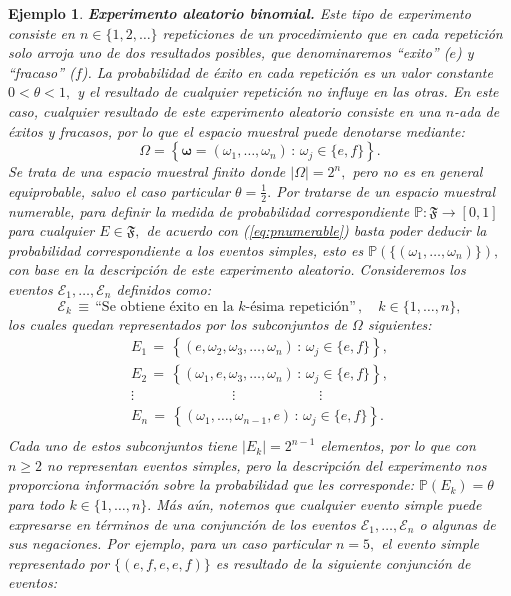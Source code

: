 \documentclass[spanish,10pt,letterpaper]{article}
\newtheorem{ejem}{Ejemplo}
\newcommand{\prob}{\mathbb{P}}
\begin{document}
	\begin{ejem} \label{ej:experimBinomial}
		\textbf{Experimento aleatorio binomial.} Este tipo de experimento consiste en $n\in\{1,2,\ldots\}$ repeticiones de un procedimiento que en cada repetición solo arroja uno de dos resultados posibles, que denominaremos ``exito'' ($e$) y ``fracaso'' ($f$). La probabilidad de éxito en cada repetición es un valor constante $0<\theta<1,$ y el resultado de cualquier repetición no influye en las otras. En este caso, cualquier resultado de este experimento aleatorio consiste en una $n$-ada de éxitos y fracasos, por lo que el espacio muestral puede denotarse mediante: $$\Omega=\left\{\mathbf{\omega}=(\omega_1,\ldots,\omega_n)\,:\,\omega_j\in\{e,f\}\right\}.$$ Se trata de una espacio muestral finito donde $|\Omega|=2^n,$ pero no es en general equiprobable, salvo el caso particular $\theta=\frac{1}{2}.$ Por tratarse de un espacio muestral numerable, para definir la medida de probabilidad correspondiente $\prob:\mathfrak{F}\rightarrow[0,1]$ para cualquier $E\in\mathfrak{F},$ de acuerdo con (\ref{eq:pnumerable}) basta poder deducir la probabilidad correspondiente a los eventos simples, esto es $\prob(\{(\omega_1,\ldots,\omega_n)\}),$ con base en la descripción de este experimento aleatorio. Consideremos los eventos $\mathcal{E}_1,\ldots,\mathcal{E}_n$ definidos como: $$\mathcal{E}_k \,\equiv\,\text{``Se obtiene éxito en la $k$-ésima repetición''}\,,\quad k\in\{1,\ldots,n\},$$ los cuales quedan representados por los subconjuntos de $\Omega$ siguientes: 
		\begin{align*}
			E_1 \,=\, \left\{(e,\omega_2,\omega_3,\ldots,\omega_n)\,:\,\omega_j\in\{e,f\}\right\}, \\
			E_2 \,=\, \left\{(\omega_1,e,\omega_3,\ldots,\omega_n)\,:\,\omega_j\in\{e,f\}\right\}, \\
			\vdots \qquad\qquad\qquad\quad \vdots \qquad\qquad\qquad \vdots \qquad \\ 
			E_n \,=\, \left\{(\omega_1,\ldots,\omega_{n-1},e)\,:\,\omega_j\in\{e,f\}\right\}. \\
		\end{align*}
		Cada uno de estos subconjuntos tiene $|E_k|=2^{n-1}$ elementos, por lo que con $n\geq 2$ no representan eventos simples, pero la descripción del experimento nos proporciona información sobre la probabilidad que les corresponde: $\prob(E_k)=\theta$ para todo $k\in\{1,\ldots,n\}.$ Más aún, notemos que cualquier evento simple puede expresarse en términos de una conjunción de los eventos $\mathcal{E}_1,\ldots,\mathcal{E}_n$ o algunas de sus negaciones. Por ejemplo, para un caso particular $n=5,$ el evento simple representado por $\{(e,f,e,e,f)\}$ es resultado de la siguiente conjunción de eventos: 

\end{ejem}
\end{document}
